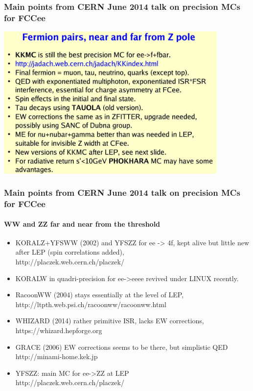 \documentclass{beamer}
\newcommand{\cbl}{\color{blue}}
\newcommand{\crd}{\color{red}}
\newcommand{\ns}{\normalsize}
\begin{document}
\begin{frame}[fragile]
\frametitle{\bf\ns 
 Main points from CERN June 2014 talk on precision MCs for FCCee}

\includegraphics[width=115mm]{./sli6.jpg}
\end{frame}

\begin{frame}[fragile]
\frametitle{\bf\ns 
 Main points from CERN June 2014 talk on precision MCs for FCCee}
\framesubtitle{\large\bf\crd WW and ZZ far and near from the threshold}

\begin{itemize}
\item
KORALZ+YFSWW (2002) and YFSZZ for ee -> 4f,
kept alive but little new after LEP (spin correlations added),\\
{\cbl http://placzek.web.cern.ch/placzek/}
\item
KORALW in quadri-precision for ee->eeee revived under LINUX recently.
\item
RacoonWW (2004) stays essentially at the level of LEP,\\
{\cbl http://ltpth.web.psi.ch/racoonww/racoonww.html}
\item
WHIZARD (2014) rather primitive ISR, lacks EW corrections,\\
{\cbl https://whizard.hepforge.org}
\item
GRACE (2006) EW corrections seems to be there, but simplistic QED\\ 
{\cbl http://minami-home.kek.jp}
\item
YFSZZ: main MC for ee->ZZ at LEP\\
{\cbl http://placzek.web.cern.ch/placzek/}
\end{itemize}
\end{frame}
\end{document}
